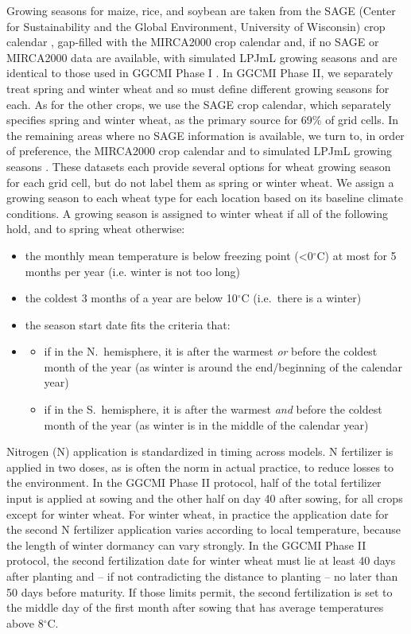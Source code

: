 \documentclass[gmd, manuscript]{copernicus} %
\begin{document}
Growing seasons for maize, rice, and soybean are taken from the SAGE (Center for Sustainability and the Global Environment, University of Wisconsin) crop calendar \citep{Sacks2010}, gap-filled with the MIRCA2000 crop calendar \citep{Portmann2010} and, if no SAGE or MIRCA2000 data are available, with simulated LPJmL growing seasons \citep{waha2012climate} and are identical to those used in GGCMI Phase I \citep{Elliott2015}.
In GGCMI Phase II, we separately treat spring and winter wheat and so must define different growing seasons for each.
As for the other crops, we use the SAGE crop calendar, which separately specifies spring and winter wheat, as the primary source for 69\% of grid cells. 
In the remaining areas where no SAGE information is available, we turn to, in order of preference, the MIRCA2000 crop calendar \citep{Portmann2010} and to simulated LPJmL growing seasons \citep{waha2012climate}.  
These datasets each provide several options for wheat growing season for each grid cell, but do not label them as spring or winter wheat. 
We assign a growing season to each wheat type for each location based on its baseline climate conditions. 
A growing season is assigned to winter wheat if all of the following hold, and to spring wheat otherwise:

\begin{itemize}
  \item{the monthly mean temperature is below freezing point (<0$^\circ$C) at most for 5 months per year (i.e. winter is not too long)}
  \item{the coldest 3 months of a year are below 10$^\circ$C (i.e.\ there is a winter)}
  \item{the season start date fits the criteria that:}
  \item[]{\begin{itemize}  
      \item{if in the N.\ hemisphere, it is after the warmest \textit{or} before the coldest month of the year (as winter is around the end/beginning of the calendar year)}
      \item{if in the S.\ hemisphere, it is after the warmest \textit{and} before the coldest month of the year (as winter is in the middle of the calendar year)}
      \end{itemize}}
\end{itemize}

Nitrogen (N) application is standardized in timing across models. 
N fertilizer is applied in two doses, as is often the norm in actual practice, to reduce losses to the environment. 
In the GGCMI Phase II protocol, half of the total fertilizer input is applied at sowing and the other half on day 40 after sowing, for all crops except for winter wheat. 
For winter wheat, in practice the application date for the second N fertilizer application varies according to local temperature, because the length of winter dormancy can vary strongly. 
In the GGCMI Phase II protocol, the second fertilization date for winter wheat must lie at least 40 days after planting and -- if not contradicting the distance to planting -- no later than 50 days before maturity.
If those limits permit, the second fertilization is set to the middle day of the first month after sowing that has average temperatures above 8$^\circ$C.
\end{document}

